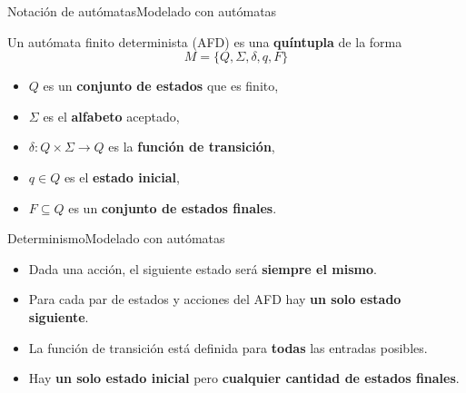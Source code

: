 \documentclass[spanish, handout]{beamer}
\begin{document}
\begin{frame}{Notación de autómatas}{Modelado con autómatas}
    \begin{definition}
        Un \alert{autómata finito determinista} (AFD) es una \textbf{quíntupla} de la forma
        \[M = \{Q, \Sigma, \delta, q, F\}\] \pause
        \begin{itemize}
            \item $Q$ es un \textbf{conjunto de estados} que es finito, \pause
            \item $\Sigma$ es el \textbf{alfabeto} aceptado, \pause
            \item $\delta : Q \times \Sigma \to Q$ es la \textbf{función de transición}, \pause
            \item $q \in Q$ es el \textbf{estado inicial}, \pause
            \item $F \subseteq Q$ es un \textbf{conjunto de estados finales}.
        \end{itemize}
    \end{definition}
\end{frame}

\begin{frame}{Determinismo}{Modelado con autómatas}
    \begin{itemize}
        \itemsep1.5ex
        \item Dada una acción, el siguiente estado será \textbf{siempre el mismo}. \pause
        \item Para cada par de estados y acciones del AFD hay \textbf{un solo estado siguiente}. \pause
        \item La función de transición está definida para \textbf{todas} las entradas posibles. \pause
        \item Hay \textbf{un solo estado inicial} pero \textbf{cualquier cantidad de estados finales}.
    \end{itemize}
    
\end{frame}



\end{document}
